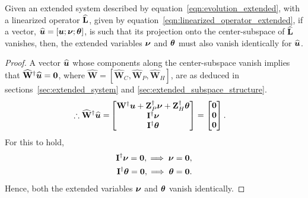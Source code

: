 \begin{lemma}
	\label{lemma:lemma1}
	Given an extended system described by equation~\eqref{eqn:evolution_extended}, with a linearized operator $\mathbf{\widehat{L}}$, given by equation~\eqref{eqn:linearized_operator_extended}, 
	if a vector, ${\widehat{\boldsymbol{u}}} = [\boldsymbol{u};\boldsymbol{\nu};\boldsymbol{\theta}]$, is such that its projection onto the center-subspace of $\mathbf{\widehat{L}}$ vanishes, then, the extended variables $\boldsymbol{\nu}$ and $\boldsymbol{\theta}$ must also vanish identically for ${\widehat{\boldsymbol{u}}}$. 
\end{lemma}

\begin{proof}
	\label{proof:proof1}
	A vector ${\widehat{\boldsymbol{u}}}$ whose components along the center-subspace vanish implies that $\mathbf{\widehat{W}}^{\dagger}{\widehat{\boldsymbol{u}}} = \boldsymbol{0}$, where $\mathbf{\widehat{W}} = [\mathbf{\widehat{W}}_{C}, \mathbf{\widehat{W}}_{P}, \mathbf{\widehat{W}}_{H}]$, are as deduced in sections~\ref{sec:extended_system} and \ref{sec:extended_subspace_structure}. 
	\begin{align}
		\therefore \mathbf{\widehat{W}}^{\dagger}{\widehat{\boldsymbol{u}}} =& \begin{bmatrix}
			\mathbf{W}^{\dagger}\boldsymbol{u} + \mathbf{Z}^{\dagger}_{P}\boldsymbol{\nu} + \mathbf{Z}^{\dagger}_{H}\boldsymbol{\theta} \\
			\mathbf{I}^{\dagger}\boldsymbol{\nu} \\
			\mathbf{I}^{\dagger}\boldsymbol{\theta}
		\end{bmatrix} = \begin{bmatrix}
			\boldsymbol{0} \\
			\boldsymbol{0} \\
			\boldsymbol{0}
		\end{bmatrix}. 		\nonumber
	\end{align}
	For this to hold,
	\begin{align}
		\mathbf{I}^{\dagger}\boldsymbol{\nu} = \boldsymbol{0}, \implies \boldsymbol{\nu} = \boldsymbol{0}, \nonumber \\ \mathbf{I}^{\dagger}\boldsymbol{\theta} = \boldsymbol{0}, \implies \boldsymbol{\theta} = \boldsymbol{0}. \nonumber
	\end{align}
	Hence, both the extended variables $\boldsymbol{\nu}$ and $\boldsymbol{\theta}$ vanish identically.
\end{proof}

